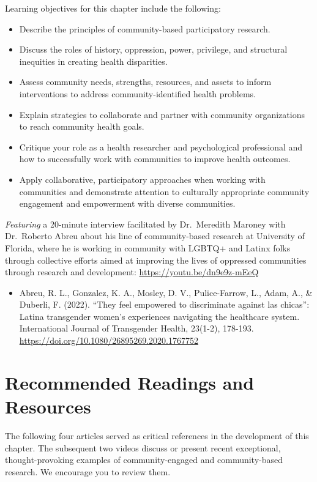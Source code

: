 \documentclass[
  11pt,
]{book}
\providecommand{\tightlist}{%
  \setlength{\itemsep}{0pt}\setlength{\parskip}{0pt}}
\begin{document}
Learning objectives for this chapter include the following:

\begin{itemize}
\tightlist
\item
  Describe the principles of community-based participatory research.
\item
  Discuss the roles of history, oppression, power, privilege, and structural inequities in creating health disparities.
\item
  Assess community needs, strengths, resources, and assets to inform interventions to address community-identified health problems.
\item
  Explain strategies to collaborate and partner with community organizations to reach community health goals.
\item
  Critique your role as a health researcher and psychological professional and how to successfully work with communities to improve health outcomes.
\item
  Apply collaborative, participatory approaches when working with communities and demonstrate attention to culturally appropriate community engagement and empowerment with diverse communities.
\end{itemize}

\emph{Featuring} a 20-minute interview facilitated by Dr.~Meredith Maroney with Dr.~Roberto Abreu about his line of community-based research at University of Florida, where he is working in community with LGBTQ+ and Latinx folks through collective efforts aimed at improving the lives of oppressed communities through research and development: \url{https://youtu.be/dn9e9z-mEeQ}

\begin{itemize}
\tightlist
\item
  Abreu, R. L., Gonzalez, K. A., Mosley, D. V., Pulice-Farrow, L., Adam, A., \& Duberli, F. (2022). ``They feel empowered to discriminate against las chicas'': Latina transgender women's experiences navigating the healthcare system. International Journal of Transgender Health, 23(1-2), 178-193. \url{https://doi.org/10.1080/26895269.2020.1767752}
\end{itemize}

\section{Recommended Readings and Resources}\label{recommended-readings-and-resources-1}

The following four articles served as critical references in the development of this chapter. The subsequent two videos discuss or present recent exceptional, thought-provoking examples of community-engaged and community-based research. We encourage you to review them.
\end{document}

